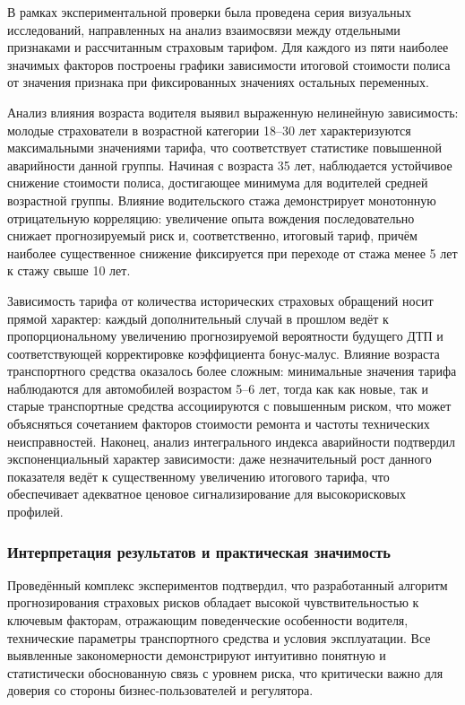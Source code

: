 В рамках экспериментальной проверки была проведена серия визуальных исследований, направленных на анализ взаимосвязи между отдельными признаками и рассчитанным страховым тарифом. Для каждого из пяти наиболее значимых факторов построены графики зависимости итоговой стоимости полиса от значения признака при фиксированных значениях остальных переменных.

Анализ влияния возраста водителя выявил выраженную нелинейную зависимость: молодые страхователи в возрастной категории 18–30 лет характеризуются максимальными значениями тарифа, что соответствует статистике повышенной аварийности данной группы. Начиная с возраста 35 лет, наблюдается устойчивое снижение стоимости полиса, достигающее минимума для водителей средней возрастной группы. Влияние водительского стажа демонстрирует монотонную отрицательную корреляцию: увеличение опыта вождения последовательно снижает прогнозируемый риск и, соответственно, итоговый тариф, причём наиболее существенное снижение фиксируется при переходе от стажа менее 5 лет к стажу свыше 10 лет.

Зависимость тарифа от количества исторических страховых обращений носит прямой характер: каждый дополнительный случай в прошлом ведёт к пропорциональному увеличению прогнозируемой вероятности будущего ДТП и соответствующей корректировке коэффициента бонус-малус. Влияние возраста транспортного средства оказалось более сложным: минимальные значения тарифа наблюдаются для автомобилей возрастом 5–6 лет, тогда как как новые, так и старые транспортные средства ассоциируются с повышенным риском, что может объясняться сочетанием факторов стоимости ремонта и частоты технических неисправностей. Наконец, анализ интегрального индекса аварийности подтвердил экспоненциальный характер зависимости: даже незначительный рост данного показателя ведёт к существенному увеличению итогового тарифа, что обеспечивает адекватное ценовое сигнализирование для высокорисковых профилей.

\subsubsection{Интерпретация результатов и практическая значимость}

Проведённый комплекс экспериментов подтвердил, что разработанный алгоритм прогнозирования страховых рисков обладает высокой чувствительностью к ключевым факторам, отражающим поведенческие особенности водителя, технические параметры транспортного средства и условия эксплуатации. Все выявленные закономерности демонстрируют интуитивно понятную и статистически обоснованную связь с уровнем риска, что критически важно для доверия со стороны бизнес-пользователей и регулятора.

